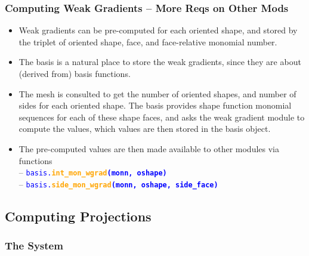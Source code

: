 \documentclass[compress]{beamer}
\begin{document}
\begin{frame}
  \frametitle{Computing Weak Gradients -- More Reqs on Other Mods}
  \begin{itemize}[<+->]
    \item Weak gradients can be pre-computed for each oriented shape, and stored by the triplet of oriented shape, face,
      and face-relative monomial number.
    \item The basis is a natural place to store the weak gradients, since they are about (derived from) basis functions.
    \item The mesh is consulted to get the number of oriented shapes, and number of sides for each oriented shape. The basis
      provides shape function monomial sequences for each of these shape faces, and asks the weak gradient module to compute the
      values, which values are then stored in the basis object.
    \item The pre-computed values are then made available to other modules via functions\\
      -- {\small \texttt{\textcolor{blue}{basis.\textbf{\textcolor{orange}{int\_mon\_wgrad}(monn, oshape)}}}}\\
      -- {\small \texttt{\textcolor{blue}{basis.\textbf{\textcolor{orange}{side\_mon\_wgrad}(monn, oshape, side\_face)}}}}
  \end{itemize}
\end{frame}
 
\subsection{Computing Projections}

\subsubsection{The System}
\end{document}

